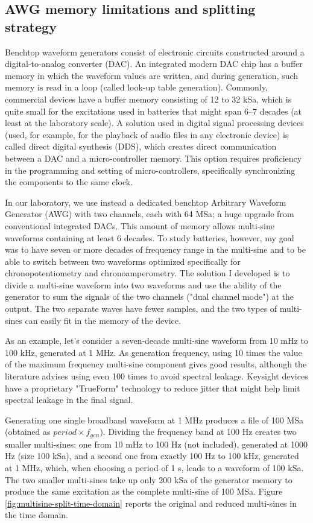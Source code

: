 \subsection{AWG memory limitations and splitting strategy}
\label{sec:multisine split}
Benchtop waveform generators consist of electronic circuits constructed around a digital-to-analog converter (DAC).
An integrated modern DAC chip has a buffer memory in which the waveform values are written, and during generation, such memory is read in a loop (called look-up table generation).
Commonly, commercial devices have a buffer memory consisting of 12 to 32 kSa, which is quite small for the excitations used in batteries that might span 6--7 decades (at least at the laboratory scale).
A solution used in digital signal processing devices (used, for example, for the playback of audio files in any electronic device) is called direct digital synthesis (DDS), which creates direct communication between a DAC and a micro-controller memory.
This option requires proficiency in the programming and setting of micro-controllers, specifically synchronizing the components to the same clock. 

In our laboratory, we use instead a dedicated benchtop Arbitrary Waveform Generator (AWG) with two channels, each with 64 MSa; a huge upgrade from conventional integrated DACs.
This amount of memory allows multi-sine waveforms containing at least 6 decades.
To study batteries, however, my goal was to have seven or more decades of frequency range in the multi-sine and to be able to switch between two waveforms optimized specifically for chronopotentiometry and chronoamperometry.
The solution I developed is to divide a multi-sine waveform into two waveforms and use the ability of the generator to sum the signals of the two channels ("dual channel mode") at the output.
The two separate waves have fewer samples, and the two types of multi-sines can easily fit in the memory of the device.

As an example, let's consider a seven-decade multi-sine waveform from 10 mHz to 100 kHz, generated at 1 MHz.
As generation frequency, using 10 times the value of the maximum frequency multi-sine component gives good results, although the literature advises using even 100 times to avoid spectral leakage.
Keysight devices have a proprietary "TrueForm" technology to reduce jitter that might help limit spectral leakage in the final signal.

Generating one single broadband waveform at 1 MHz produces a file of 100 MSa (obtained as $period \times f_{gen}$).
Dividing the frequency band at 100 Hz creates two smaller multi-sines: one from 10 mHz to 100 Hz (not included), generated at 1000 Hz (size 100 kSa), and a second one from exactly 100 Hz to 100 kHz, generated at 1 MHz, which, when choosing a period of 1 s, leads to a waveform of 100 kSa.
The two smaller multi-sines take up only 200 kSa of the generator memory to produce the same excitation as the complete multi-sine of 100 MSa.
Figure \ref{fig:multisine-split-time-domain} reports the original and reduced multi-sines in the time domain.


